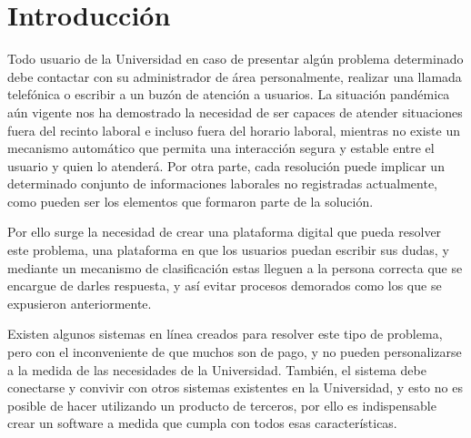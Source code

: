 \chapter*{Introducción}\label{chapter:introduction}

Todo usuario de la Universidad en caso de presentar algún problema determinado debe contactar con su administrador de área personalmente, realizar una llamada telefónica o escribir a un buzón de atención a usuarios. La situación pandémica aún vigente nos ha demostrado la necesidad de ser capaces de atender situaciones fuera del recinto laboral e incluso fuera del horario laboral, mientras no existe un mecanismo automático que permita una interacción segura y estable entre el usuario y quien lo atenderá. Por otra parte, cada resolución puede implicar un determinado conjunto de informaciones laborales no registradas actualmente, como pueden ser los elementos que formaron parte de la solución.\newline

Por ello surge la necesidad de crear una plataforma digital que pueda resolver este problema, una plataforma en que los usuarios puedan escribir sus dudas, y mediante un mecanismo de clasificación estas lleguen a la persona correcta que se encargue de darles respuesta, y así evitar procesos demorados como los que se expusieron anteriormente.\newline

Existen algunos sistemas en línea creados para resolver este tipo de problema, pero con el inconveniente de que muchos son de pago, y no pueden personalizarse a la medida de las necesidades de la Universidad. También, el sistema debe conectarse y convivir con otros sistemas existentes en la Universidad, y esto no es posible de hacer utilizando un producto de terceros, por ello es indispensable crear un software a medida que cumpla con todos esas características.\newline

